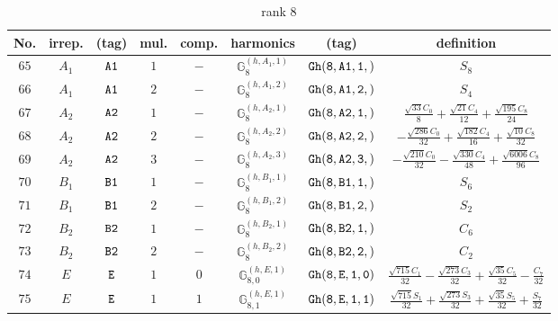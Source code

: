 \documentclass[fleqn,8pt]{jsarticle}
\begin{document}
\begin{table}[ht!]
\begin{center}
\caption{rank 8}
\renewcommand{\arraystretch}{1.3}
\begin{tabular}{cccccccc} \hline \hline
No. & irrep. & (tag) & mul. & comp. & harmonics & (tag) & definition \\ \hline
$ 65 $ & $ A_{1} $ & $ {\tt A1} $ & $ 1 $ & $ - $ & $ \mathbb{G}_{8}^{(h,A_{1},1)} $ & $ {\tt Gh(8,A1,1,)} $ & $ S_{8} $ \\
$ 66 $ & $ A_{1} $ & $ {\tt A1} $ & $ 2 $ & $ - $ & $ \mathbb{G}_{8}^{(h,A_{1},2)} $ & $ {\tt Gh(8,A1,2,)} $ & $ S_{4} $ \\
$ 67 $ & $ A_{2} $ & $ {\tt A2} $ & $ 1 $ & $ - $ & $ \mathbb{G}_{8}^{(h,A_{2},1)} $ & $ {\tt Gh(8,A2,1,)} $ & $ \frac{\sqrt{33} C_{0}}{8} + \frac{\sqrt{21} C_{4}}{12} + \frac{\sqrt{195} C_{8}}{24} $ \\
$ 68 $ & $ A_{2} $ & $ {\tt A2} $ & $ 2 $ & $ - $ & $ \mathbb{G}_{8}^{(h,A_{2},2)} $ & $ {\tt Gh(8,A2,2,)} $ & $ - \frac{\sqrt{286} C_{0}}{32} + \frac{\sqrt{182} C_{4}}{16} + \frac{\sqrt{10} C_{8}}{32} $ \\
$ 69 $ & $ A_{2} $ & $ {\tt A2} $ & $ 3 $ & $ - $ & $ \mathbb{G}_{8}^{(h,A_{2},3)} $ & $ {\tt Gh(8,A2,3,)} $ & $ - \frac{\sqrt{210} C_{0}}{32} - \frac{\sqrt{330} C_{4}}{48} + \frac{\sqrt{6006} C_{8}}{96} $ \\
$ 70 $ & $ B_{1} $ & $ {\tt B1} $ & $ 1 $ & $ - $ & $ \mathbb{G}_{8}^{(h,B_{1},1)} $ & $ {\tt Gh(8,B1,1,)} $ & $ S_{6} $ \\
$ 71 $ & $ B_{1} $ & $ {\tt B1} $ & $ 2 $ & $ - $ & $ \mathbb{G}_{8}^{(h,B_{1},2)} $ & $ {\tt Gh(8,B1,2,)} $ & $ S_{2} $ \\
$ 72 $ & $ B_{2} $ & $ {\tt B2} $ & $ 1 $ & $ - $ & $ \mathbb{G}_{8}^{(h,B_{2},1)} $ & $ {\tt Gh(8,B2,1,)} $ & $ C_{6} $ \\
$ 73 $ & $ B_{2} $ & $ {\tt B2} $ & $ 2 $ & $ - $ & $ \mathbb{G}_{8}^{(h,B_{2},2)} $ & $ {\tt Gh(8,B2,2,)} $ & $ C_{2} $ \\
$ 74 $ & $ E $ & $ {\tt E} $ & $ 1 $ & $ 0 $ & $ \mathbb{G}_{8,0}^{(h,E,1)} $ & $ {\tt Gh(8,E,1,0)} $ & $ \frac{\sqrt{715} C_{1}}{32} - \frac{\sqrt{273} C_{3}}{32} + \frac{\sqrt{35} C_{5}}{32} - \frac{C_{7}}{32} $ \\
$ 75 $ & $ E $ & $ {\tt E} $ & $ 1 $ & $ 1 $ & $ \mathbb{G}_{8,1}^{(h,E,1)} $ & $ {\tt Gh(8,E,1,1)} $ & $ \frac{\sqrt{715} S_{1}}{32} + \frac{\sqrt{273} S_{3}}{32} + \frac{\sqrt{35} S_{5}}{32} + \frac{S_{7}}{32} $ \\

\end{tabular}
\end{center}
\end{table}
\end{document}
